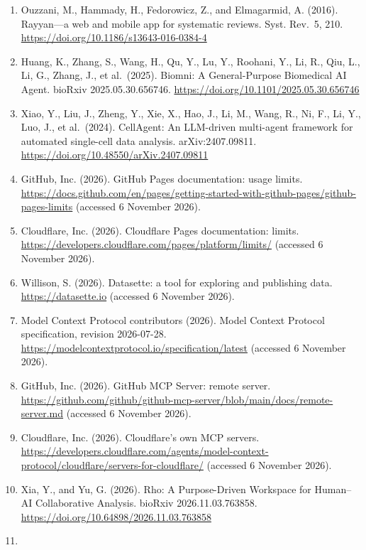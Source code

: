 \documentclass[11pt,a4paper]{article}
\begin{document}
\begin{enumerate}
  et al.~(2021). An open source machine learning framework for efficient
  and transparent systematic reviews. Nat. Mach. Intell. 3, 125--133.
  \url{https://doi.org/10.1038/s42256-020-00287-7}
\item
  Ouzzani, M., Hammady, H., Fedorowicz, Z., and Elmagarmid, A. (2016).
  Rayyan---a web and mobile app for systematic reviews. Syst. Rev.~5,
  210. \url{https://doi.org/10.1186/s13643-016-0384-4}
\item
  Huang, K., Zhang, S., Wang, H., Qu, Y., Lu, Y., Roohani, Y., Li, R.,
  Qiu, L., Li, G., Zhang, J., et al.~(2025). Biomni: A General-Purpose
  Biomedical AI Agent. bioRxiv 2025.05.30.656746.
  \url{https://doi.org/10.1101/2025.05.30.656746}
\item
  Xiao, Y., Liu, J., Zheng, Y., Xie, X., Hao, J., Li, M., Wang, R., Ni,
  F., Li, Y., Luo, J., et al.~(2024). CellAgent: An LLM-driven
  multi-agent framework for automated single-cell data analysis.
  arXiv:2407.09811. \url{https://doi.org/10.48550/arXiv.2407.09811}
\item
  GitHub, Inc. (2026). GitHub Pages documentation: usage limits.
  \url{https://docs.github.com/en/pages/getting-started-with-github-pages/github-pages-limits}
  (accessed 6 November 2026).
\item
  Cloudflare, Inc. (2026). Cloudflare Pages documentation: limits.
  \url{https://developers.cloudflare.com/pages/platform/limits/}
  (accessed 6 November 2026).
\item
  Willison, S. (2026). Datasette: a tool for exploring and publishing
  data. \url{https://datasette.io} (accessed 6 November 2026).
\item
  Model Context Protocol contributors (2026). Model Context Protocol
  specification, revision 2026-07-28.
  \url{https://modelcontextprotocol.io/specification/latest} (accessed 6
  November 2026).
\item
  GitHub, Inc. (2026). GitHub MCP Server: remote server.
  \url{https://github.com/github/github-mcp-server/blob/main/docs/remote-server.md}
  (accessed 6 November 2026).
\item
  Cloudflare, Inc. (2026). Cloudflare's own MCP servers.
  \url{https://developers.cloudflare.com/agents/model-context-protocol/cloudflare/servers-for-cloudflare/}
  (accessed 6 November 2026).
\item
  Xia, Y., and Yu, G. (2026). Rho: A Purpose-Driven Workspace for
  Human--AI Collaborative Analysis. bioRxiv 2026.11.03.763858.
  \url{https://doi.org/10.64898/2026.11.03.763858}
\item

\end{enumerate}
\end{document}
